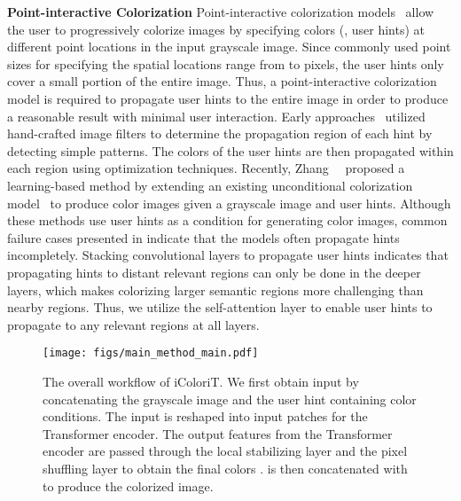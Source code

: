 \documentclass[10pt,twocolumn,letterpaper]{article}
\begin{document}
\vspace{+0.1cm}
\noindent \textbf{Point-interactive Colorization} 
Point-interactive colorization models~\cite{levin2004, zhang2017, side} allow the user to progressively colorize images by specifying colors (\ie, user hints) at different point locations in the input grayscale image.
Since commonly used point sizes for specifying the spatial locations range from  to  pixels, the user hints only cover a small portion of the entire image.  
Thus, a point-interactive colorization model is required to propagate user hints to the entire image in order to produce a reasonable result with minimal user interaction. 
Early approaches~\cite{levin2004, side} utilized hand-crafted image filters to determine the propagation region of each hint by detecting simple patterns. 
The colors of the user hints are then propagated within each region using optimization techniques. 
Recently, Zhang~\etal~\cite{zhang2017} proposed a learning-based method by extending an existing unconditional colorization model~\cite{cic} to produce color images given a grayscale image and user hints. 
Although these methods use user hints as a condition for generating color images, common failure cases presented in  indicate that the models often propagate hints incompletely. 
Stacking convolutional layers to propagate user hints indicates that propagating hints to distant relevant regions can only be done in the deeper layers, which makes colorizing larger semantic regions more challenging than nearby regions. 
Thus, we utilize the self-attention layer to enable user hints to propagate to any relevant regions at all layers. 

\begin{figure*}[ht]
    \centering
    \texttt{[image: figs/main\_method\_main.pdf]}
    \vspace{-0.6cm}
    \caption{The overall workflow of iColoriT. We first obtain input  by concatenating the grayscale image  and the user hint  containing color conditions. The input is reshaped into input patches for the Transformer encoder. The output features from the Transformer encoder are passed through the local stabilizing layer and the pixel shuffling layer to obtain the final colors .  is then concatenated with  to produce the colorized image.}
    \label{fig:method_main}
    \vspace{-0.5cm}
\end{figure*}
\end{document}
